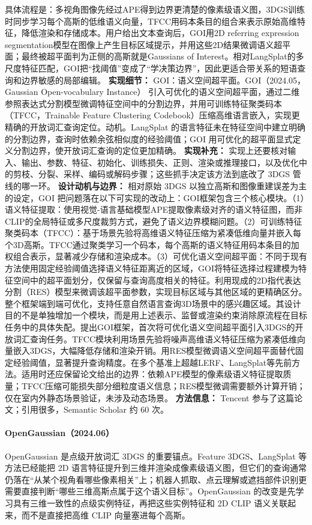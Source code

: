 具体流程是：多视角图像先经过APE得到边界更清楚的像素级语义图，3DGS训练时同步学习每个高斯的低维语义向量，TFCC用码本条目的组合来表示原始高维特征，降低渲染和存储成本。用户给出文本查询后，GOI用2D referring expression segmentation模型在图像上产生目标区域提示，并用这些2D结果微调语义超平面；最终被超平面判为正侧的高斯就是Gaussians of Interest。相对LangSplat的多尺度特征匹配，GOI把“找阈值”变成了“学决策边界”，因此更适合带关系的短语查询和边界敏感的局部编辑。
\textbf{实现细节：} GOI：语义空间超平面。GOI（2024.05，Gaussian Open-vocabulary Instance） 引入可优化的语义空间超平面，通过二维参照表达式分割模型微调特征空间中的分割边界，并用可训练特征聚类码本（TFCC，Trainable Feature Clustering Codebook）压缩高维语言嵌入，实现更精确的开放词汇查询定位。动机。LangSplat 的语言特征未在特征空间中建立明确的分割边界，查询时依赖余弦相似度的经验阈值；GOI 用可优化的超平面显式定义分割边界，使开放词汇查询的定位更加精确。
\textbf{实现补充：} 实现上还要核对输入、输出、参数、特征、初始化、训练损失、正则、渲染或推理接口，以及优化中的剪枝、分裂、采样、编码或解码步骤；这些抓手决定该方法到底改了 3DGS 管线的哪一环。
\textbf{设计动机与边界：} 相对原始 3DGS 以独立高斯和图像重建误差为主的设定，GOI 把问题落在以下可实现的改动上：GOI框架包含三个核心模块。（1）语义特征提取：使用视觉-语言基础模型APE提取像素级对齐的语义特征图，而非CLIP的全局特征或多尺度裁剪方式，避免了语义边界模糊问题。（2）可训练特征聚类码本（TFCC）：基于场景先验将高维语义特征压缩为紧凑低维向量并嵌入每个3D高斯。TFCC通过聚类学习一个码本，每个高斯的语义特征用码本条目的加权组合表示，显著减少存储和渲染成本。（3）可优化语义空间超平面：不同于现有方法使用固定经验阈值选择语义特征距离近的区域，GOI将特征选择过程建模为特征空间中的超平面划分，仅保留与查询高度相关的特征。利用现成的2D指代表达分割（RES）模型来微调该超平面参数，实现目标区域与其他区域的更精确区分。整个框架端到端可优化，支持任意自然语言查询3D场景中的感兴趣区域。其设计目的不是单独增加一个模块，而是用上述表示、监督或渲染约束消除原流程在目标任务中的具体失配。提出GOI框架，首次将可优化语义空间超平面引入3DGS的开放词汇查询任务。TFCC模块利用场景先验将噪声高维语义特征压缩为紧凑低维向量嵌入3DGS，大幅降低存储和渲染开销。用RES模型微调语义空间超平面替代固定经验阈值，显著提升查询精度。在多个基准上超越LERF、LangSplat等先前方法。适用时还应保留论文给出的边界：依赖APE模型的像素级语义特征提取质量；TFCC压缩可能损失部分细粒度语义信息；RES模型微调需要额外计算开销；仅在室内外静态场景验证，未涉及动态场景。
\textbf{方法信息：} Tencent 参与了这篇论文；引用很多，Semantic Scholar 约 60 次。



\paragraph{OpenGaussian（2024.06）\cite{2406_02058}}
OpenGaussian 是点级开放词汇 3DGS 的重要锚点。Feature 3DGS、LangSplat 等方法已经能把 2D 语言特征提升到三维并渲染成像素级语义图，但它们的查询通常仍落在“从某个视角看哪些像素相关”上；机器人抓取、点云理解或遮挡部件识别更需要直接判断“哪些三维高斯点属于这个语义目标”。OpenGaussian 的改变是先学习具有三维一致性的点级实例特征，再把这些实例特征和 2D CLIP 语义关联起来，而不是直接把高维 CLIP 向量塞进每个高斯。


